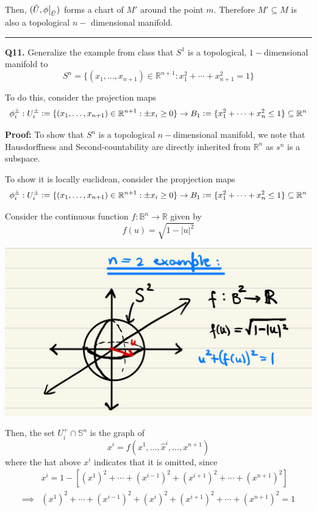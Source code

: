 \documentclass{article}
\newcommand{\defeq}{\vcentcolon=}
\newcommand{\restr}[2]{{%
  \left.\kern-\nulldelimiterspace %
  #1 %
  \vphantom{\big|} %
  \right|_{#2} %
  }}
\begin{document}
\vskip 0.25cm
Then, $(\tilde{U}, \restr{\phi}{\tilde{U}})$ forms a chart of $M'$ around the point $m$. Therefore $M' \subseteq M$ is also a topological $n-$ dimensional manifold.


\vskip 0.5cm
\hrule 
\vskip 0.5cm

\textbf{Q11.} Generalize the example from class that $S^1$ is a topological, $1-$dimensional manifold to 
\[ S^n = \{ (x_1, \dots, x_{n+1}) \in \mathbb{R}^{n+1} : x_1^2 + \cdots + x_{n+1}^2 = 1 \} \]

To do this, consider the projection maps 
\[ \phi_i^{\pm} : U_i^{\pm} \defeq \{ (x_1, \dots, x_{n+1}) \in \mathbb{R}^{n+1} : \pm x_i \geq 0 \} \rightarrow B_1 \defeq \{x_1^2 + \cdots + x_n^2 \leq 1\} \subseteq \mathbb{R}^n \]

\vskip 0.5cm
\textbf{Proof:} To show that $S^{n}$ is a topological $n-$dimensional manifold, we note that Hausdorffness and Second-countability are directly inherited from $\mathbb{R}^n$ as $s^{n}$ is a subspace.


To show it is locally euclidean, consider the propjection maps 
\[ \phi_i^{\pm} : U_i^{\pm} \defeq \{ (x_1, \dots, x_{n+1}) \in \mathbb{R}^{n+1} : \pm x_i \geq 0 \} \rightarrow B_1 \defeq \{x_1^2 + \cdots + x_n^2 \leq 1\} \subseteq \mathbb{R}^n \]

Consider the continuous function $f : \mathbb{B}^n \rightarrow \mathbb{R}$ given by 
\[ f(u) = \sqrt{1 - |u|^2} \]

\vskip 0.5cm
\begin{center}
  \includegraphics[scale=0.10]{Q11.jpg}
\end{center}

\vskip 0.5cm
Then, the set $U_i^{+} \cap \mathbb{S}^n$ is the graph of 
\[ x^i = f(x^1, \dots, \hat{x}^i, \dots, x^{n+1}) \]
where the hat above $x^i$ indicates that it is omitted, since 
\begin{align*}
  &x^i = 1 - \left[ (x^1)^2 + \cdots + (x^{i-1})^2 + (x^{i+1})^2 + \cdots + (x^{n+1})^2 \right] \\
  \implies &(x^1)^2 + \cdots + (x^{i-1})^2 + (x^i)^2 + (x^{i+1})^2 + \cdots + (x^{n+1})^2 = 1
\end{align*}
\end{document}
